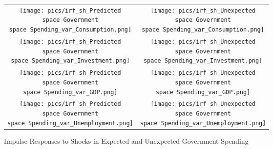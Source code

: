 \documentclass[12pt]{article}
\begin{document}
\begin{figure}\caption{Impulse Responses to Shocks in Expected and Unexpected Government Spending}\label{fg:irf_gov}
\begin{center}
\hspace*{-0.2in}\begin{tabular}{cc}
\texttt{[image: pics/irf\_sh\_Predicted\\space Government\\space Spending\_var\_Consumption.png]} & \texttt{[image: pics/irf\_sh\_Unexpected\\space Government\\space Spending\_var\_Consumption.png]} \\
\texttt{[image: pics/irf\_sh\_Predicted\\space Government\\space Spending\_var\_Investment.png]} & \texttt{[image: pics/irf\_sh\_Unexpected\\space Government\\space Spending\_var\_Investment.png]} \\
\texttt{[image: pics/irf\_sh\_Predicted\\space Government\\space Spending\_var\_GDP.png]} & \texttt{[image: pics/irf\_sh\_Unexpected\\space Government\\space Spending\_var\_GDP.png]} \\
\texttt{[image: pics/irf\_sh\_Predicted\\space Government\\space Spending\_var\_Unemployment.png]} & \texttt{[image: pics/irf\_sh\_Unexpected\\space Government\\space Spending\_var\_Unemployment.png]} 
\end{tabular}
\end{center}
\end{figure}
\end{document}
